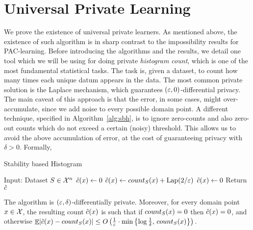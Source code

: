\documentclass[12pt,a4paper,oneside,onecolumn]{book}
\begin{document}
\chapter{Universal Private Learning}
\label{chp:universal-privacy}

We prove the existence of universal private learners. 
As mentioned above, the existence of such algorithm is in sharp contrast to the impossibility results for PAC-learning.
Before introducing the algorithms and the results, we detail one tool which we will be using for doing private \emph{histogram count}, which is one of the most fundamental statistical tasks.
The task is, given a dataset, to count how many times each unique datum appears in the data.
The most common private solution is the Laplace mechanism, which guarantees $(\varepsilon,0)$-differential privacy. 
The main caveat of this approach is that the error, in some cases, might over-accumulate, since we add noise to every possible domain point.
A different technique, specified in Algorithm~\ref{alg:sbh}, is to ignore zero-counts and also zero-out counts which do not exceed a certain (noisy) threshold. This allows us to avoid the above accumulation of error, at the cost of guaranteeing privacy with $\delta>0$.
Formally, 


\begin{algorithm}
  \caption{Stability based Histogram \cite{JMLR:v20:18-549}}\label{alg:sbh}
  \begin{algorithmic}[1]
    \State Input: Dataset $S\in \mathcal{X}^n$
            \State $\hat{c}(x) \leftarrow 0$
        \Else %
            \State $\hat{c}(x) \leftarrow count_{S}(x) + \mathrm{Lap}(2/\varepsilon)$
                \State $\hat{c}(x) \leftarrow 0$
            \EndIf
        \EndIf
    \EndFor    
    \State Return $\hat{c}$
  \end{algorithmic}
\end{algorithm}



\begin{theorem}
\label{thm:sbh}
The    algorithm is $(\varepsilon,\delta)$-differentially private.
Moreover, for every domain point $x\in\mathcal{X}$,
the resulting count $\hat{c}(x)$ is such that if $count_{S}(x) = 0$ then 
$\hat{c}(x) = 0$, and otherwise $\mathop{\mathbb{E}}\lvert\hat{c}(x) - count_{S}(x)\rvert \leq O\left(\frac{1}{\varepsilon}\cdot\min\left\{\log\frac{1}{\delta},\,count_{S}(x)\right\}\right)$.
\end{theorem}
\end{document}
